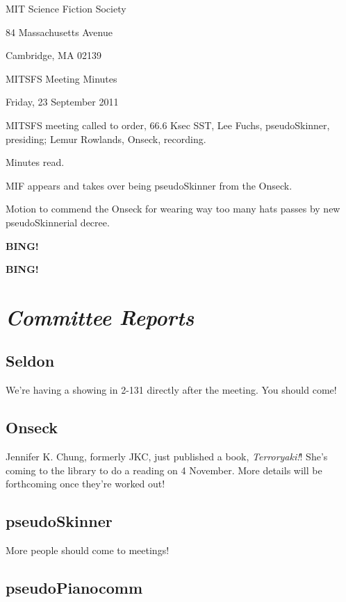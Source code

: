 \documentclass[10pt]{article}
\newcommand{\bing}{{\bf BING!} }
\newcommand{\goto}[1]{\bing \vskip 12pt \section*{{\em{#1}}}}
\newcommand{\skinner}{Lee Fuchs, pseudoSkinner}
\newcommand{\onseck}{Lemur Rowlands, Onseck}
\newcommand{\meetingdate}{Friday, 23 September 2011}
\begin{document}
\begin{center}

MIT Science Fiction Society

84 Massachusetts Avenue

Cambridge, MA 02139

\vspace{12pt}

MITSFS Meeting Minutes

\meetingdate

\end{center}

\vspace{18pt}

\setlength{\parskip}{6pt}

\noindent
MITSFS meeting called to order, 66.6 Ksec SST,
\skinner, presiding; \onseck, recording.

Minutes read.

MIF appears and takes over being pseudoSkinner from the Onseck.

Motion to commend the Onseck for wearing way too many hats passes
by new pseudoSkinnerial decree.


\bing

\goto{Committee Reports}

\subsection*{Seldon}

We're having a showing in 2-131 directly after the meeting.  You should
come!

\subsection*{Onseck}

Jennifer K. Chung, formerly JKC, just published a book, \emph{Terroryaki!}!
She's coming to the library to do a reading on 4 November.  More details
will be forthcoming once they're worked out!

\subsection*{pseudoSkinner}

More people should come to meetings!

\subsection*{pseudoPianocomm}
\end{document}
